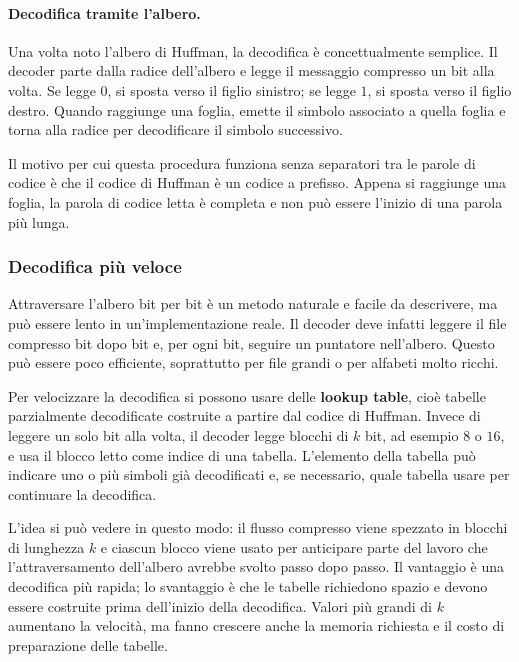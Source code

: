 \documentclass{article}
\theoremstyle{definition}
\numberwithin{equation}{section}
\begin{document}
\paragraph{Decodifica tramite l'albero.}
Una volta noto l'albero di Huffman, la decodifica è concettualmente semplice. Il decoder parte dalla radice dell'albero e legge il messaggio compresso un bit alla volta. Se legge $0$, si sposta verso il figlio sinistro; se legge $1$, si sposta verso il figlio destro. Quando raggiunge una foglia, emette il simbolo associato a quella foglia e torna alla radice per decodificare il simbolo successivo.

Il motivo per cui questa procedura funziona senza separatori tra le parole di codice è che il codice di Huffman è un codice a prefisso. Appena si raggiunge una foglia, la parola di codice letta è completa e non può essere l'inizio di una parola più lunga.

\subsubsection{Decodifica più veloce}
Attraversare l'albero bit per bit è un metodo naturale e facile da descrivere, ma può essere lento in un'implementazione reale. Il decoder deve infatti leggere il file compresso bit dopo bit e, per ogni bit, seguire un puntatore nell'albero. Questo può essere poco efficiente, soprattutto per file grandi o per alfabeti molto ricchi.

Per velocizzare la decodifica si possono usare delle \textbf{lookup table}, cioè tabelle parzialmente decodificate costruite a partire dal codice di Huffman. Invece di leggere un solo bit alla volta, il decoder legge blocchi di $k$ bit, ad esempio $8$ o $16$, e usa il blocco letto come indice di una tabella. L'elemento della tabella può indicare uno o più simboli già decodificati e, se necessario, quale tabella usare per continuare la decodifica.

L'idea si può vedere in questo modo: il flusso compresso viene spezzato in blocchi di lunghezza $k$ e ciascun blocco viene usato per anticipare parte del lavoro che l'attraversamento dell'albero avrebbe svolto passo dopo passo. Il vantaggio è una decodifica più rapida; lo svantaggio è che le tabelle richiedono spazio e devono essere costruite prima dell'inizio della decodifica. Valori più grandi di $k$ aumentano la velocità, ma fanno crescere anche la memoria richiesta e il costo di preparazione delle tabelle.
\end{document}
